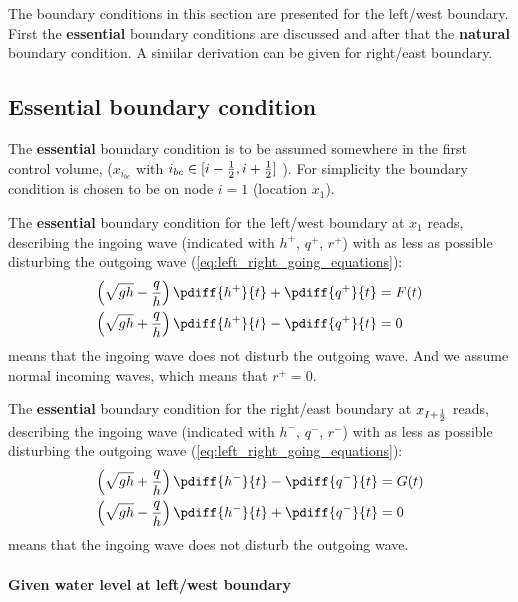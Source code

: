 The boundary conditions in this section are presented for the left/west boundary.
First the \textbf{essential} boundary conditions are discussed and after that the \textbf{natural} boundary condition.
A similar derivation can be given for right/east boundary.

\subsection{Essential boundary condition}
The \textbf{essential} boundary condition is to be assumed somewhere in the first control volume, ($x_{i_{bc}}$ with $i_{bc} \in [i-\frac{1}{2}, i+\frac{1}{2}]$ ).
For simplicity the boundary condition is chosen to be on node $i=1$ (location $x_{1}$).


The \textbf{essential} boundary condition for the left/west boundary at $x_{1}$ reads, describing the ingoing wave (indicated with $h^+$, $q^+$, $r^+$) with as less as possible disturbing the outgoing wave (\autoref{eq:left_right_going_equations}):
\begin{align}
    \left(\sqrt{gh} - \frac{q}{h}\right) \pdiff{h^{+}}{t} + \pdiff{q^{+}}{t} & = F(t)
    \label{eq:essential_conv_2d_1}
    \\
    \left(\sqrt{gh} + \frac{q}{h}\right) \pdiff{h^{+}}{t} - \pdiff{q^{+}}{t} & = 0
    \label{eq:essential_conv_2d_2}
\end{align}
 means that the ingoing wave does not disturb the outgoing wave.
And we assume normal incoming waves, which means that $r^+=0$.

The \textbf{essential} boundary condition for the right/east boundary at $x_{I+\frac{1}{2}}$ reads, describing the ingoing wave (indicated with $h^-$, $q^-$, $r^-$) with as less as possible disturbing the outgoing wave (\autoref{eq:left_right_going_equations}):\begin{align}
    \left(\sqrt{gh} + \frac{q}{h}\right) \pdiff{h^{-}}{t} - \pdiff{q^{-}}{t} & = G(t)
    \label{eq:essential_conv_2d_3}
    \\
    \left(\sqrt{gh} - \frac{q}{h}\right) \pdiff{h^{-}}{t} + \pdiff{q^{-}}{t} & = 0
    \label{eq:essential_conv_2d_4}
\end{align}
 means that the ingoing wave does not disturb the outgoing wave.
\paragraph*{Given water level at left/west boundary}

